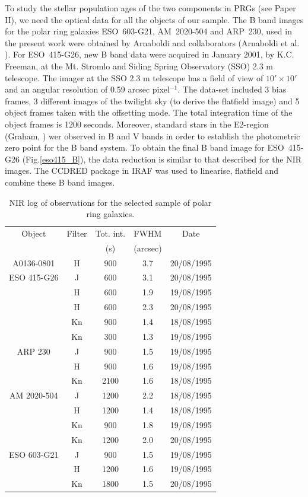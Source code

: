 \documentclass{aa}
\begin{document}
To study the stellar population ages of the two components in PRGs 
(see Paper II), we need the optical data for all the objects of our
sample.
The B band images for the polar ring galaxies ESO~603-G21,
AM~2020-504 and ARP~230, used in the present work were obtained
by Arnaboldi and collaborators (Arnaboldi et al. \cite{magda95}).
For ESO~415-G26, new B band data were acquired in January 2001,
by K.C. Freeman, at the Mt. Stromlo and Siding Spring Observatory (SSO) 2.3 m 
telescope.
The imager at the SSO 2.3 m telescope has a field of view of $10' \times 
10'$ and an angular resolution of 0.59 arcsec pixel$^{-1}$.
The data-set included 3 bias frames, 3 different images of the twilight
sky (to derive the flatfield image) and 5 object frames taken with the
offsetting mode.
The total integration time of the object frames is 1200 seconds.
Moreover, standard stars in the E2-region (Graham, \cite{graham82}) 
wer observed in B and  V bands in order to establish the photometric zero
point for the B band system.
To obtain the final B band image for ESO~415-G26 (Fig.\ref{eso415_B}), 
the data reduction is similar to that described for the NIR images. 
The CCDRED package in IRAF was used
to linearise, flatfield and combine these B band images.
           

\begin{table}
\centering
\caption[]{NIR log of observations for the selected sample of polar ring 
galaxies.}
\label{obslog}
\begin{tabular}{ccccc}
\hline\hline
Object & Filter & Tot. int. & FWHM & Date \\
       &        &  (s)      &(arcsec)&    \\
\hline
A0136-0801 & H  & 900& 3.7& 20/08/1995\\
ESO 415-G26 & J & 600& 3.1 & 20/08/1995\\
            & H & 600 & 1.9 & 19/08/1995\\
            & H & 600 & 2.3 & 20/08/1995\\
            & Kn & 900 & 1.4 & 18/08/1995\\
            & Kn & 300 & 1.3 & 19/08/1995\\
ARP 230 & J & 900 & 1.5 & 19/08/1995\\
        & H & 900 & 1.6 & 19/08/1995\\
        & Kn & 2100 & 1.6 & 18/08/1995\\
AM 2020-504 & J & 1200 & 2.2 & 18/08/1995\\
            & H & 1200 & 1.4 & 18/08/1995\\
            & Kn & 900 & 1.8 & 19/08/1995\\
            & Kn & 1200 & 2.0 & 20/08/1995\\
ESO 603-G21 & J & 900 & 1.5 & 19/08/1995\\
            & H & 1200 & 1.6 & 19/08/1995\\
            & Kn & 1800& 1.5 &20/08/1995\\
\hline
\end{tabular}
\end{table}
\end{document}
